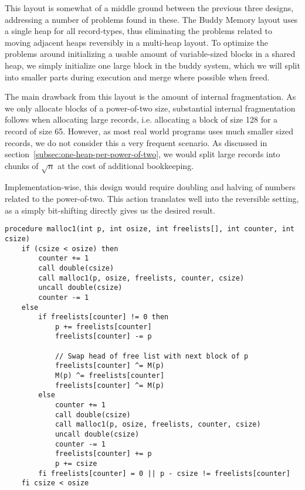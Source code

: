 This layout is somewhat of a middle ground between the previous three designs, addressing a number of problems found in these. The Buddy Memory layout uses a single heap for all record-types, thus eliminating the problems related to moving adjacent heaps reversibly in a multi-heap layout. To optimize the problems around initializing a usable amount of variable-sized blocks in a shared heap, we simply initialize one large block in the buddy system, which we will split into smaller parts during execution and merge where possible when freed.

The main drawback from this layout is the amount of internal fragmentation. As we only allocate blocks of a power-of-two size, substantial internal fragmentation follows when allocating large records, i.e. allocating a block of size 128 for a record of size 65. However, as most real world programs uses much smaller sized records, we do not consider this a very frequent scenario. As discussed in section~\ref{subsec:one-heap-per-power-of-two}, we would split large records into chunks of $\sqrt{n}$ at the cost of additional bookkeeping.

Implementation-wise, this design would require doubling and halving of numbers related to the power-of-two. This action translates well into the reversible setting, as a simply bit-shifting directly gives us the desired result.\\

\begin{lstlisting}[caption={The Buddy Memory algorithm implemented in extended Janus}, language=janus, style=basic, label={lst:buddy-memory}]
  procedure malloc1(int p, int osize, int freelists[], int counter, int csize)
    if (csize < osize) then
        counter += 1
        call double(csize)
        call malloc1(p, osize, freelists, counter, csize) 
        uncall double(csize)
        counter -= 1
    else
        if freelists[counter] != 0 then
            p += freelists[counter]
            freelists[counter] -= p

            // Swap head of free list with next block of p
            freelists[counter] ^= M(p)
            M(p) ^= freelists[counter]
            freelists[counter] ^= M(p)
        else
            counter += 1
            call double(csize)
            call malloc1(p, osize, freelists, counter, csize)
            uncall double(csize)
            counter -= 1
            freelists[counter] += p
            p += csize
        fi freelists[counter] = 0 || p - csize != freelists[counter]
    fi csize < osize   
\end{lstlisting}


